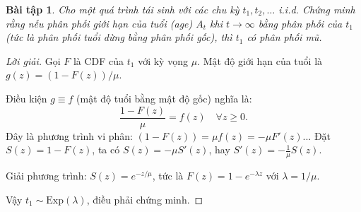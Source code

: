 \documentclass[8pt,a4paper]{article}
\newtheorem{exercise}{Bài tập}
\newenvironment{solution}{\begin{proof}[Lời giải]}{\end{proof}}
\begin{document}
\begin{exercise}
Cho một quá trình tái sinh với các chu kỳ $t_1, t_2, \ldots$ i.i.d. Chứng minh rằng nếu phân phối giới hạn của tuổi (age) $A_t$ khi $t \to \infty$ bằng phân phối của $t_1$ (tức là phân phối tuổi dừng bằng phân phối gốc), thì $t_1$ có phân phối mũ.
\end{exercise}
\begin{solution}
Gọi $F$ là CDF của $t_1$ với kỳ vọng $\mu$. Mật độ giới hạn của tuổi là $g(z) = (1-F(z))/\mu$.

Điều kiện $g \equiv f$ (mật độ tuổi bằng mật độ gốc) nghĩa là:
\[
  \frac{1-F(z)}{\mu} = f(z) \quad \forall z \geq 0.
\]
Đây là phương trình vi phân: $(1-F(z)) = \mu f(z) = -\mu F'(z)$... Đặt $S(z) = 1-F(z)$, ta có $S(z) = -\mu S'(z)$, hay $S'(z) = -\frac{1}{\mu}S(z)$.

Giải phương trình: $S(z) = e^{-z/\mu}$, tức là $F(z) = 1 - e^{-\lambda z}$ với $\lambda = 1/\mu$.

Vậy $t_1 \sim \text{Exp}(\lambda)$, điều phải chứng minh.
\end{solution}
\end{document}
